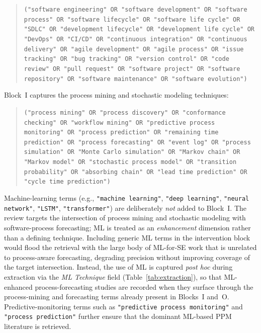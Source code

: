 \begin{quote}
\small
\texttt{("software engineering" OR "software development" OR "software process"
OR "software lifecycle" OR "software life cycle" OR "SDLC" OR "development
lifecycle" OR "development life cycle" OR "DevOps" OR "CI/CD" OR "continuous
integration" OR "continuous delivery" OR "agile development" OR "agile process"
OR "issue tracking" OR "bug tracking" OR "version control" OR "code review" OR
"pull request" OR "software project" OR "software repository" OR "software
maintenance" OR "software evolution")}
\end{quote}

Block~I captures the process mining and stochastic modeling techniques:

\begin{quote}
\small
\texttt{("process mining" OR "process discovery" OR "conformance checking" OR
"workflow mining" OR "predictive process monitoring" OR "process prediction" OR
"remaining time prediction" OR "process forecasting" OR "event log" OR "process
simulation" OR "Monte Carlo simulation" OR "Markov chain" OR "Markov model" OR
"stochastic process model" OR "transition probability" OR "absorbing chain" OR
"lead time prediction" OR "cycle time prediction")}
\end{quote}

Machine-learning terms (e.g., \texttt{"machine learning"}, \texttt{"deep
learning"}, \texttt{"neural network"}, \texttt{"LSTM"}, \texttt{"transformer"})
are deliberately \emph{not} added to Block~I. The review targets the
intersection of process mining and stochastic modeling with software-process
forecasting; ML is treated as an \emph{enhancement} dimension rather than a
defining technique. Including generic ML terms in the intervention block would
flood the retrieval with the large body of ML-for-SE work that is unrelated to
process-aware forecasting, degrading precision without improving coverage of
the target intersection. Instead, the use of ML is captured \emph{post hoc}
during extraction via the \textit{ML Technique} field
(Table~\ref{tab:extraction}), so that ML-enhanced process-forecasting studies
are recorded when they surface through the process-mining and forecasting
terms already present in Blocks~I and~O. Predictive-monitoring terms such as
\texttt{"predictive process monitoring"} and \texttt{"process prediction"}
further ensure that the dominant ML-based PPM literature is retrieved.

